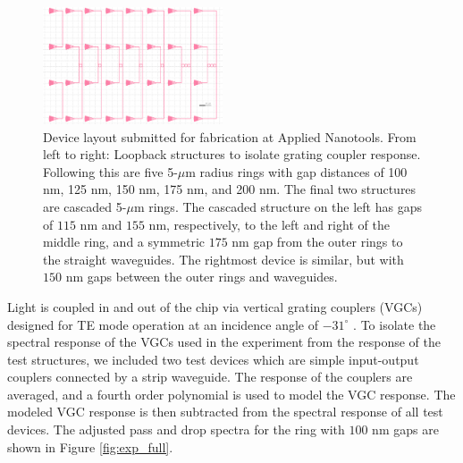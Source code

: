 \documentclass[letterpaper, 10 pt, conference]{ieeeconf}
\begin{document}
\begin{figure}[!ht]
    \centering
    \includegraphics[width = 0.475\textwidth]{layout.png}
    \caption{Device layout submitted for fabrication at Applied Nanotools. From left to right: Loopback structures to isolate grating coupler response. Following this are five 5-$\mu$m radius rings with gap distances of 100 nm, 125 nm, 150 nm, 175 nm, and 200 nm. The final two structures are cascaded 5-$\mu$m rings. The cascaded structure on the left has gaps of $115$ nm and $155$ nm, respectively, to the left and right of the middle ring, and a symmetric $175$ nm gap from the outer rings to the straight waveguides. The rightmost device is similar, but with $150$ nm gaps between the outer rings and waveguides.}
    \label{fig:layout}
\end{figure}
Light is coupled in and out of the chip via vertical grating couplers (VGCs) designed for TE mode operation at an incidence angle of $-31^\circ$ \cite{VGC}. To isolate the spectral response of the VGCs used in the experiment from the response of the test structures, we included two test devices which are simple input-output couplers connected by a strip waveguide. The response of the couplers are averaged, and a fourth order polynomial is used to model the VGC response. The modeled VGC response is then subtracted from the spectral response of all test devices. The adjusted pass and drop spectra for the ring with $100$ nm gaps are shown in Figure \ref{fig:exp_full}.
\end{document}

